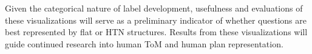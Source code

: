 \vspace{15pt}

Given the categorical nature of label development, usefulness and evaluations of these visualizations will serve as a preliminary indicator of whether questions are best represented by flat or HTN structures. Results from these visualizations will guide continued research into human ToM and human plan representation.

